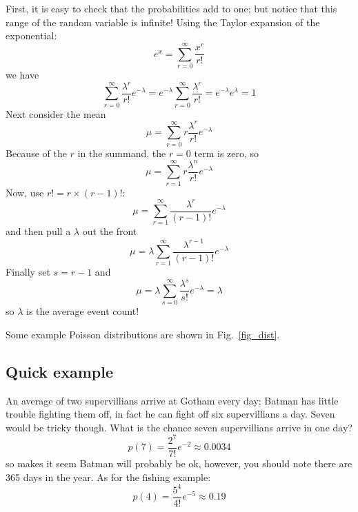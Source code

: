 \documentclass[11pt,a4paper]{scrartcl}
\begin{document}
First, it is easy to check that the probabilities add to one; but
notice that this range of the random variable is infinite!  Using the
Taylor expansion of the exponential:
\begin{equation}
e^x=\sum_{r=0}^\infty \frac{x^r}{r!}
\end{equation}
we have
\begin{equation}
\sum_{r=0}^\infty \frac{\lambda^r}{r!}e^{-\lambda}=e^{-\lambda}\sum_{r=0}^\infty \frac{\lambda^r}{r!}=e^{-\lambda}e^{\lambda}=1
\end{equation}
Next consider the mean
\begin{equation}
\mu = \sum_{r=0}^\infty r\frac{\lambda^r}{r!}e^{-\lambda}
\end{equation}
Because of the $r$ in the summand, the $r=0$ term is zero, so
\begin{equation}
\mu = \sum_{r=1}^\infty r\frac{\lambda^n}{r!}e^{-\lambda}
\end{equation}
Now, use $r!=r\times (r-1)!$:
\begin{equation}
\mu = \sum_{r=1}^\infty \frac{\lambda^r}{(r-1)!}e^{-\lambda}
\end{equation}
and then pull a $\lambda$ out the front
\begin{equation}
\mu = \lambda \sum_{r=1}^\infty \frac{\lambda^{r-1}}{(r-1)!}e^{-\lambda}
\end{equation}
Finally set $s=r-1$ and
\begin{equation}
\mu = \lambda \sum_{s=0}^\infty \frac{\lambda^s}{s!}e^{-\lambda}=\lambda
\end{equation}
so $\lambda$ is the average event count!

Some example Poisson distributions are shown in Fig.~\ref{fig_dist}.

\subsection*{Quick example}

An average of two supervillians arrive at Gotham every day; Batman has
little trouble fighting them off, in fact he can fight off six
supervillians a day. Seven would be tricky though. What is the chance
seven supervillians arrive in one day?
\begin{equation}
p(7)=\frac{2^7}{7!}e^{-2}\approx 0.0034
\end{equation}
so makes it seem Batman will probably be ok, however, you should note
there are 365 days in the year. As for the fishing example:
\begin{equation}
p(4)=\frac{5^4}{4!}e^{-5}\approx 0.19
\end{equation}
\end{document}
